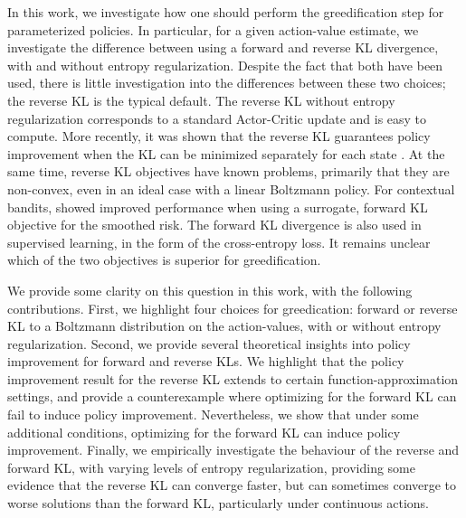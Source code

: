 \documentclass{article}
\begin{document}
In this work, we investigate how one should perform the greedification step for parameterized policies. In particular, for a given action-value estimate, we investigate the difference between using a forward and reverse KL divergence, with and without entropy regularization. 
Despite the fact that both have been used, there is little investigation into the differences between these two choices; the reverse KL is the typical default. The reverse KL without entropy regularization corresponds to a standard Actor-Critic update and is easy to compute. More recently, it was shown that the reverse KL guarantees policy improvement when the KL can be minimized separately for each state \citep[p.~4]{haarnoja2018soft}. At the same time, reverse KL objectives have known problems, primarily that they are non-convex, even in an ideal case with a linear Boltzmann policy. For contextual bandits, \citet{chen2019surrogate} showed improved performance when using a surrogate, forward KL objective for the smoothed risk. The forward KL divergence is also used in supervised learning, in the form of the cross-entropy loss. It remains unclear which of the two objectives is superior for greedification.

We provide some clarity on this question in this work, with the following contributions. First, we highlight four choices for greedication: forward or reverse KL to a Boltzmann distribution on the action-values, with or without entropy regularization. %
Second, we provide several theoretical insights into policy improvement for forward and reverse KLs. We highlight that the policy improvement result for the reverse KL extends to certain function-approximation settings, and provide a counterexample where optimizing for the forward KL can fail to induce policy improvement. Nevertheless, we show that under some additional conditions, optimizing for the forward KL can induce policy improvement.  Finally, we empirically investigate the behaviour of the reverse and forward KL, with varying levels of entropy regularization, providing some evidence that the reverse KL can converge faster, but can sometimes converge to worse solutions than the forward KL, particularly under continuous actions. 
\end{document}
